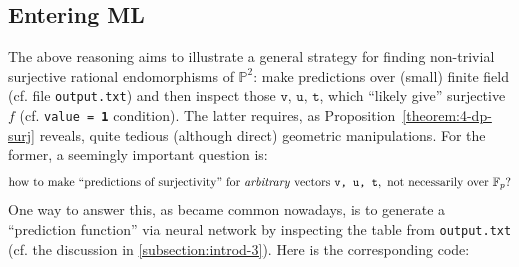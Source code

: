 \documentclass[14pt]{amsart}
\theoremstyle{definition}
\theoremstyle{remark}
\newcommand{\p}{\mathbb{P}}
\begin{document}
\subsection{Entering ML}
\label{subsection:ex-calc-2}

The above reasoning aims to illustrate a general strategy for
finding non-trivial surjective rational endomorphisms of $\p^2$:
make predictions over (small) finite field (cf. file
\texttt{output.txt}) and then inspect those $\texttt{v, u, t}$,
which ``likely give'' surjective $f$ (cf. \texttt{value = {\bf 1}}
condition). The latter requires, as
Proposition~\ref{theorem:4-dp-surj} reveals, quite tedious
(although direct) geometric manipulations. For the former, a
seemingly important question is:
$$
\text{how to make ``predictions of surjectivity'' for
\emph{arbitrary} vectors}\ \texttt{v, u, t},\ \text{not
necessarily over}\ \mathbb{F}_p?
$$
One way to answer this, as became common nowadays, is to generate
a ``prediction function'' via neural network by inspecting the
table from \texttt{output.txt} (cf. the discussion in
{\ref{subsection:introd-3}}). Here is the corresponding code:

\medskip
\end{document}
